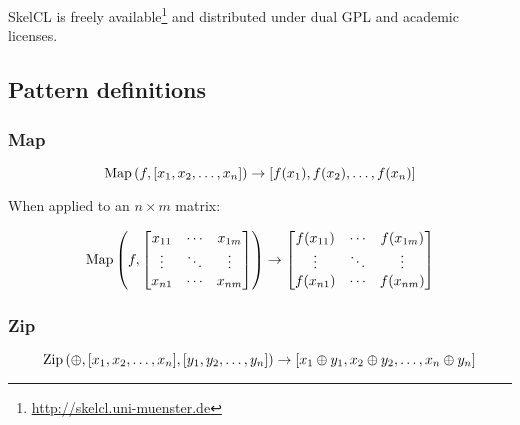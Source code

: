 SkelCL is freely
available\footnote{\url{http://skelcl.uni-muenster.de}} and
distributed under dual GPL and academic licenses.



\subsection{Pattern definitions}


\subsubsection{Map}

\begin{equation}
\operatorname*{Map}\left(f, [x_1,x_2,\ldots,x_n]\right) \to [f(x_1),f(x_2),\ldots,f(x_n)]
\end{equation}

When applied to an $n \times m$ matrix:

\begin{equation}
\operatorname*{Map}\left(f,
\begin{bmatrix}
  x_{11} & \cdots & x_{1m} \\
  \vdots & \ddots & \vdots \\
  x_{n1} & \cdots & x_{nm}
\end{bmatrix}\right)
\to
\begin{bmatrix}
  f(x_{11}) & \cdots & f(x_{1m}) \\
  \vdots & \ddots & \vdots \\
  f(x_{n1}) & \cdots & f(x_{nm})
\end{bmatrix}
\end{equation}

\subsubsection{Zip}

\begin{equation}
\operatorname*{Zip}\left( \oplus, [x_1,x_2,\ldots,x_n], [y_1,y_2,\ldots,y_n] \right)
\to
\left[ x_1 \oplus y_1, x_2 \oplus y_2, \ldots, x_n \oplus y_n \right]
\end{equation}

